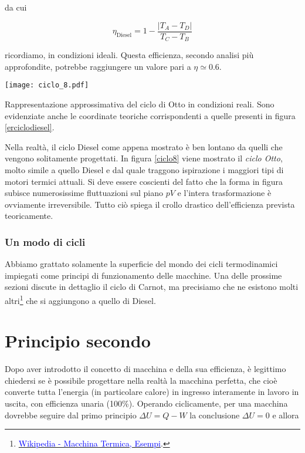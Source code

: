 \noindent da cui

\[ \eta_\text{Diesel} = 1 - \frac{|T_A - T_D|}{T_C - T_B} \]

\noindent ricordiamo, in condizioni ideali. Questa efficienza,
secondo analisi più approfondite, potrebbe raggiungere un
valore pari a $\eta \simeq 0.6$.

\begin{marginfigure}
    \centering
    \texttt{[image: ciclo\_8.pdf]}
    \caption{Rappresentazione approssimativa del ciclo di Otto in
    condizioni reali. Sono evidenziate anche le coordinate teoriche
    corrispondenti a quelle presenti in figura \ref{erciclodiesel}.}
    \label{ciclo8}
\end{marginfigure}

Nella realtà, il ciclo Diesel come appena mostrato è ben lontano
da quelli che vengono solitamente progettati. In figura \ref{ciclo8}
viene mostrato il \textit{ciclo Otto}, molto simile a quello Diesel
e dal quale traggono ispirazione i maggiori tipi di motori termici
attuali. Si deve essere coscienti del fatto che la forma in figura
subisce numerosissime fluttuazioni sul piano $pV$ e l'intera trasformazione
è ovviamente irreversibile. Tutto ciò spiega il crollo drastico
dell'efficienza prevista teoricamente.

\subsubsection*{Un modo di cicli}
Abbiamo grattato solamente la superficie del mondo dei cicli termodinamici
impiegati come principi di funzionamento delle macchine.
Una delle prossime sezioni discute in dettaglio il ciclo di Carnot,
ma precisiamo che ne esistono molti altri\footnote{\href{https://it.wikipedia.org/wiki/Macchina_termica\#Esempi}{\textcolor{blue}{Wikipedia - Macchina Termica, Esempi}}.} %
che si aggiungono a quello di Diesel.




\section{Principio secondo}
Dopo aver introdotto il concetto di macchina e della sua efficienza,
è legittimo chiedersi se è possibile progettare nella realtà
la macchina perfetta, che cioè converte tutta l'energia
(in particolare calore) in ingresso interamente in lavoro in uscita,
con efficienza unaria (100\%).
Operando ciclicamente, per una macchina dovrebbe seguire dal primo
principio $\Delta U = Q - W$ la conclusione $\Delta U = 0$ e allora

